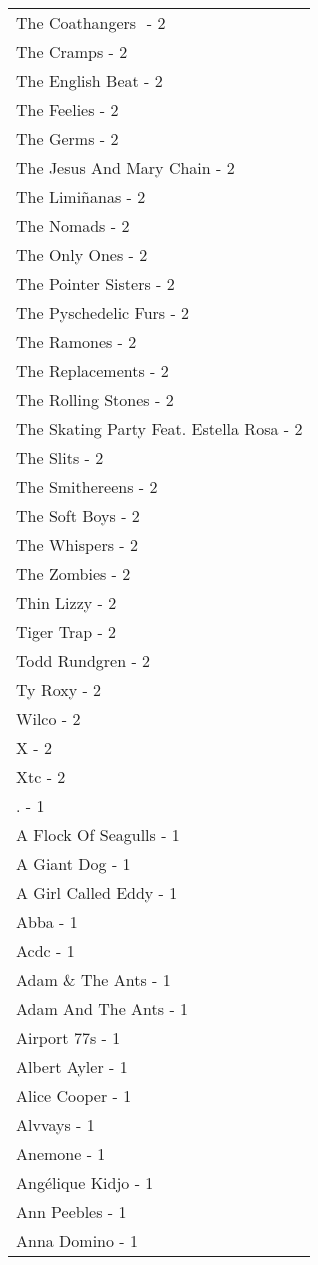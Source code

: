 \documentclass[
]{article}
\begin{document}
\begin{longtable}{l}
The Coathangers ‎ - 2 \\ 
The Cramps - 2 \\ 
The English Beat - 2 \\ 
The Feelies - 2 \\ 
The Germs - 2 \\ 
The Jesus And Mary Chain - 2 \\ 
The Limiñanas - 2 \\ 
The Nomads - 2 \\ 
The Only Ones - 2 \\ 
The Pointer Sisters - 2 \\ 
The Pyschedelic Furs - 2 \\ 
The Ramones - 2 \\ 
The Replacements - 2 \\ 
The Rolling Stones - 2 \\ 
The Skating Party Feat. Estella Rosa - 2 \\ 
The Slits - 2 \\ 
The Smithereens - 2 \\ 
The Soft Boys - 2 \\ 
The Whispers - 2 \\ 
The Zombies - 2 \\ 
Thin Lizzy - 2 \\ 
Tiger Trap - 2 \\ 
Todd Rundgren - 2 \\ 
Ty Roxy - 2 \\ 
Wilco - 2 \\ 
X - 2 \\ 
Xtc - 2 \\ 
. - 1 \\ 
A Flock Of Seagulls - 1 \\ 
A Giant Dog - 1 \\ 
A Girl Called Eddy - 1 \\ 
Abba - 1 \\ 
Acdc - 1 \\ 
Adam \& The Ants - 1 \\ 
Adam And The Ants - 1 \\ 
Airport 77s - 1 \\ 
Albert Ayler - 1 \\ 
Alice Cooper - 1 \\ 
Alvvays - 1 \\ 
Anemone - 1 \\ 
Angélique Kidjo - 1 \\ 
Ann Peebles - 1 \\ 
Anna Domino - 1 \\ 

\end{longtable}
\end{document}
